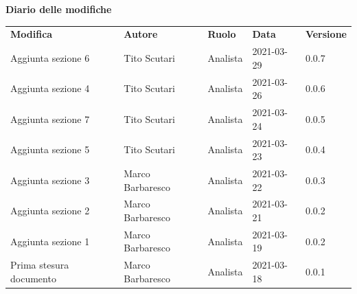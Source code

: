 \documentclass[a4paper]{article}
\begin{document}
    \begin{center}
        \textbf{\Large Diario delle modifiche}\\
        \vspace{10px}
        \begin{table}[h!]
        \centering
        \renewcommand{\arraystretch}{1.8}
        \begin{tabular}{p{150px} p{90px} p{50px} p{60px} p{45px}}
            \rowcolor{logo!70} \textbf{Modifica} & \textbf{Autore} & \textbf{Ruolo} & \textbf{Data} & \textbf{Versione}\\
            Aggiunta sezione 6 & Tito Scutari     & Analista & 2021-03-29 & 0.0.7 \\
            Aggiunta sezione 4 & Tito Scutari     & Analista & 2021-03-26 & 0.0.6 \\
            Aggiunta sezione 7 & Tito Scutari     & Analista & 2021-03-24 & 0.0.5 \\
            Aggiunta sezione 5 & Tito Scutari     & Analista & 2021-03-23 & 0.0.4 \\
            Aggiunta sezione 3 & Marco Barbaresco & Analista & 2021-03-22 & 0.0.3 \\
            Aggiunta sezione 2 & Marco Barbaresco & Analista & 2021-03-21 & 0.0.2 \\
            Aggiunta sezione 1 & Marco Barbaresco & Analista & 2021-03-19 & 0.0.2 \\
            Prima stesura documento & Marco Barbaresco & Analista & 2021-03-18 & 0.0.1 \\

        \end{tabular}
    \end{table}
    \end{center}

    \newpage
    \tableofcontents
    \newpage
    \newpage
    \listoftables
    \newpage
    
    
    
    
    
    
    
\end{document}
